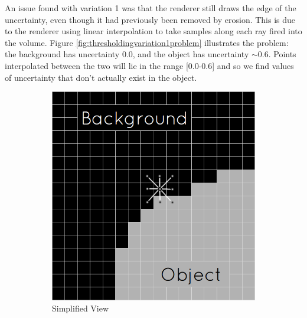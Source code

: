 An issue found with variation 1 was that the renderer still draws the edge of the uncertainty, even though it had previously been removed by erosion. This is due to the renderer using linear interpolation to take samples along each ray fired into the volume. Figure \ref{fig:thresholdingvariation1problem} illustrates the problem: the background has uncertainty 0.0, and the object has uncertainty $\sim$0.6. Points interpolated between the two will lie in the range [0.0-0.6] and so we find values of uncertainty that don't actually exist in the object.

\begin{figure}[h]
  \centering
  \begin{subfigure}[b]{0.481\textwidth}
    \includegraphics[width=\textwidth]{images/thresholding/thresholdvariation1example.png}
    \caption{Simplified View}
    \label{fig:thresholdingvariation1example}
  \end{subfigure}%
  ~ %
  \begin{subfigure}[b]{0.519\textwidth}

\end{subfigure}
\end{figure}
